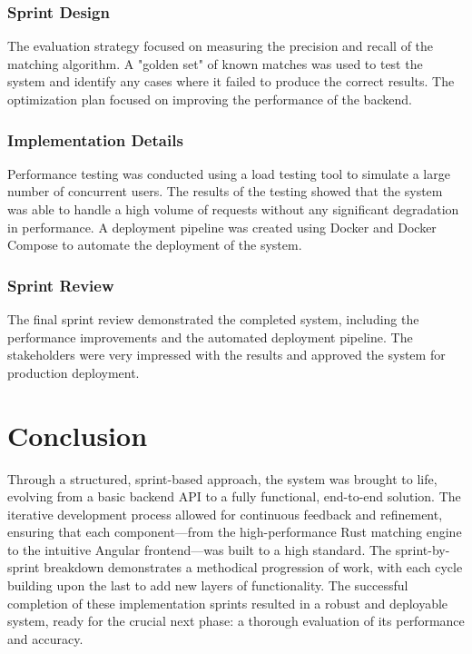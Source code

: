 \subsubsection{Sprint Design}
The evaluation strategy focused on measuring the precision and recall of the matching algorithm. A "golden set" of known matches was used to test the system and identify any cases where it failed to produce the correct results. The optimization plan focused on improving the performance of the backend.

\subsubsection{Implementation Details}
Performance testing was conducted using a load testing tool to simulate a large number of concurrent users. The results of the testing showed that the system was able to handle a high volume of requests without any significant degradation in performance. A deployment pipeline was created using Docker and Docker Compose to automate the deployment of the system.

\subsubsection{Sprint Review}
The final sprint review demonstrated the completed system, including the performance improvements and the automated deployment pipeline. The stakeholders were very impressed with the results and approved the system for production deployment.

\section{Conclusion}
Through a structured, sprint-based approach, the system was brought to life, evolving from a basic backend API to a fully functional, end-to-end solution. The iterative development process allowed for continuous feedback and refinement, ensuring that each component—from the high-performance Rust matching engine to the intuitive Angular frontend—was built to a high standard. The sprint-by-sprint breakdown demonstrates a methodical progression of work, with each cycle building upon the last to add new layers of functionality. The successful completion of these implementation sprints resulted in a robust and deployable system, ready for the crucial next phase: a thorough evaluation of its performance and accuracy.